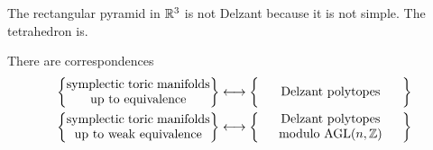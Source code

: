 \documentclass[a4paper]{article}
\begin{document}
\begin{eg}
  The rectangular pyramid in $\mathbb{R}^3$ is not Delzant because it is not simple. The tetrahedron is.
\end{eg}

\begin{thm}[Delzant]
  There are correspondences
  \begin{align*}
    \left\{\parbox{4cm}{\centering symplectic toric manifolds up to equivalence}\right\} &\longleftrightarrow \left\{\parbox{4cm}{\centering Delzant polytopes}\vphantom{\parbox{4cm}{\centering symplectic toric manifolds up to equivalence}}\right\}\\
    \left\{\parbox{4cm}{\centering symplectic toric manifolds up to weak equivalence}\right\} &\longleftrightarrow \left\{\parbox{4cm}{\centering Delzant polytopes \\modulo $\mathrm{AGL}(n, \Z)$}\vphantom{\parbox{4cm}{\centering symplectic toric manifolds up to equivalence}}\right\}
  \end{align*}
\end{thm}
\end{document}

